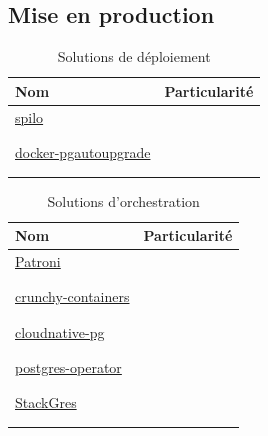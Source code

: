 \documentclass[a4paper,12pt]{article}
\begin{document}
\begin{multicols*}{2}
\subsection*{Mise en production}
\label{sec:org0239586}
\begin{table}[H]
\caption{Solutions de déploiement}
\centering
\begin{tabular}{ll}
Nom & Particularité\\
\hline
\href{https://github.com/zalando/spilo}{spilo} & \\
 & \\
 & \\
\href{https://github.com/pgautoupgrade/docker-pgautoupgrade}{docker-pgautoupgrade} & \\
 & \\
 & \\
\end{tabular}
\end{table}

\begin{table}[H]
\caption{Solutions d'orchestration}
\centering
\begin{tabular}{ll}
Nom & Particularité\\
\hline
\href{https://github.com/patroni/patroni}{Patroni} & \\
 & \\
 & \\
\href{https://github.com/CrunchyData/crunchy-containers}{crunchy-containers} & \\
 & \\
 & \\
\href{https://github.com/cloudnative-pg/cloudnative-pg}{cloudnative-pg} & \\
 & \\
 & \\
\href{https://github.com/CrunchyData/postgres-operator}{postgres-operator} & \\
 & \\
 & \\
\href{https://gitlab.com/ongresinc/stackgres}{StackGres} & \\
 & \\
 & \\
\end{tabular}
\end{table}


\end{multicols*}
\end{document}
